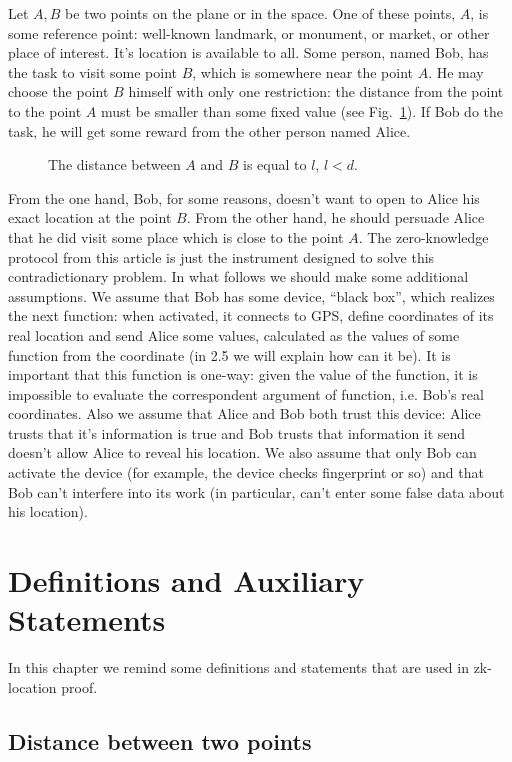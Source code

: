 \documentclass{article}
\begin{document}
Let $A, B$ be two points on the plane or in the space.
One of these points, $A$, is some reference point: well-known landmark, or monument, or market, or other place of interest.
It’s location is available to all.
Some person, named Bob, has the task to visit some point $B$, which is somewhere near the point $A$.
He may choose the point $B$ himself with only one restriction: the distance from the point      
to the point $A$ must be smaller than some fixed value (see Fig.~\ref{fig-1}).
If Bob do the task, he will get some reward from the other person named Alice.
\begin{figure}
  \centering
  \def\svgwidth{\columnwidth}
  
\caption{The distance between $A$ and $B$ is equal to $l$, $l < d$.}
\label{fig-1}
\end{figure}
%
From the one hand, Bob, for some reasons, doesn’t want to open to Alice his exact location at the point $B$.
From the other hand, he should persuade Alice that he did visit some place which is close to the point $A$.
The zero-knowledge protocol from this article is just the instrument designed to solve this contradictionary problem.
In what follows we should make some additional assumptions.
We assume that Bob has some device, “black box”, which realizes the next function: when activated, it connects to GPS,
define coordinates of its real location and send Alice some values, calculated as the values of some function from the coordinate (in 2.5 we will explain how can it be).
It is important that this function is one-way: given the value of the function, it is impossible to evaluate the correspondent argument of function, i.e. Bob’s real coordinates.
Also we assume that Alice and Bob both trust this device: Alice trusts that it’s information is true and Bob trusts that information it send doesn’t allow Alice to reveal his location.
We also assume that only Bob can activate the device (for example, the device checks fingerprint or so) and that Bob can’t interfere into its work (in particular,
can’t enter some false data about his location).

\section{Definitions and Auxiliary Statements}

In this chapter we remind some definitions and statements that are used in zk-location proof.

\subsection{Distance between two points}  %
\end{document}
